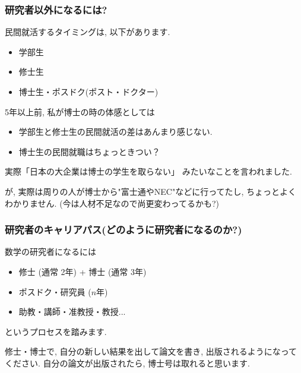 \documentclass[11pt,dvipdfmx]{beamer}
\theoremstyle{definition}
\theoremstyle{remark}
\begin{document}
    \begin{frame} 
 \frametitle{研究者以外になるには?}
 民間就活するタイミングは, 以下があります. 
 \begin{itemize}
 \item 学部生
\item 修士生
\item 博士生・ポスドク(ポスト・ドクター)
 \end{itemize}

\vspace{11pt}
5年以上前, 私が博士の時の体感としては
\begin{block}{}
 \begin{itemize}
\item 学部生と修士生の民間就活の差はあんまり感じない.
\item 博士生の民間就職はちょっときつい？
 \end{itemize}
 \end{block}
実際「日本の大企業は博士の学生を取らない」
みたいなことを言われました.

が, 実際は周りの人が博士から"富士通やNEC"などに行ってたし, ちょっとよくわかりません. (今は人材不足なので尚更変わってるかも?)

 \end{frame}
 
 \begin{frame}
 \frametitle{研究者のキャリアパス(どのように研究者になるのか?)}
 
 数学の研究者になるには
 
 \begin{itemize}
 \item 修士 (通常 2年) + 博士 (通常 3年)
 \item ポスドク・研究員 ($n$年)
 \item 助教・講師・准教授・教授...
 \end{itemize} 
 というプロセスを踏みます.
 
 \vspace{11pt}
 修士・博士で, 自分の新しい結果を出して論文を書き, 出版されるようになってください. 
自分の論文が出版されたら, 博士号は取れると思います.
 \end{frame}
 
 


 
 
\end{document}
